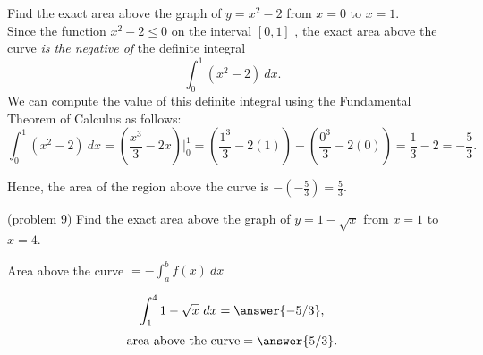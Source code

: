 \documentclass[handout]{ximera}
\begin{document}
\begin{example}[example 9]
Find the exact area above the graph of $y = x^2 - 2$ from $x = 0$ to $x = 1$. \\
Since the function $x^2 - 2 \leq 0$  on the interval $[0,1]$ , the exact area above the curve \textit{is the negative of} the 
definite integral 
\[\int_0^1 (x^2 -2) \ dx.\]
We can compute the value of this definite integral using the Fundamental Theorem of Calculus as follows:
\[\int_0^1 (x^2 -2) \ dx = \left(\frac{x^3}{3}-2x\right) \Bigg|_{0}^1 = \left(\frac{1^3}{3}-2(1)\right) - \left(\frac{0^3}{3}- 2(0)\right) = \frac13 - 2 =-\frac53.\]

Hence, the area of the region above the curve is $-\left(-\frac53\right) = \frac53$.

\begin{image}
\end{image}
\end{example}


\begin{problem}(problem 9)
Find the exact area above the graph of $y = 1 - \sqrt x$ from $x = 1$ to $x = 4$. \\
\begin{hint}
Area above the curve $= -\int_a^b f(x) \ dx$
\end{hint}
\[\int_1^4 1 - \sqrt x \ dx = \answer{-5/3},\]
\[\text{area above the curve} = \answer{5/3}.\]
\end{problem}
\end{document}
